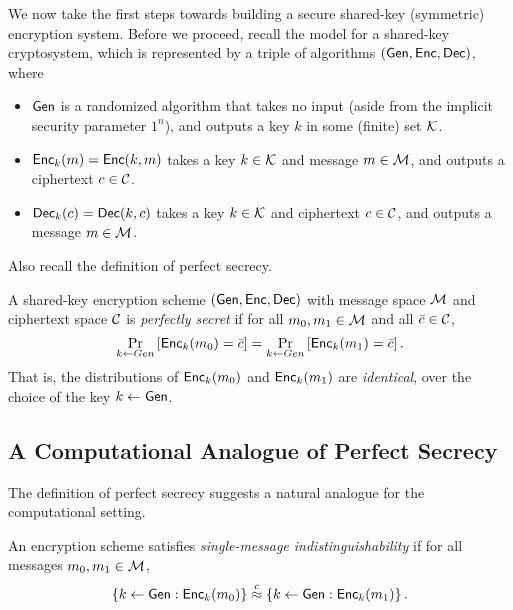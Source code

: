 \documentclass[11pt]{article}
\begin{document}
We now take the first steps towards building a secure shared-key
(symmetric) encryption system.  Before we proceed, recall the model
for a shared-key cryptosystem, which is represented by a triple of
algorithms $(\mathsf{Gen}, \mathsf{Enc},\mathsf{Dec})$, where
\begin{itemize}
\item $\mathsf{Gen}$ is a randomized algorithm that takes no input (aside
  from the implicit security parameter $1^{n}$), and outputs a key $k$
  in some (finite) set $\mathcal{K}$.
\item $\mathsf{Enc}_k(m) = \mathsf{Enc}(k,m)$ takes a key $k \in \mathcal{K}$ and
  message $m \in \mathcal{M}$, and outputs a ciphertext $c \in
  \mathcal{C}$.
\item $\mathsf{Dec}_k(c) = \mathsf{Dec}(k, c)$ takes a key $k \in \mathcal{K}$ and
  ciphertext $c \in \mathcal{C}$, and outputs a message $m \in
  \mathcal{M}$.
\end{itemize}

Also recall the definition of perfect secrecy.

\begin{definition}
  A shared-key encryption scheme $(\mathsf{Gen}, \mathsf{Enc}, \mathsf{Dec})$ with
  message space $\mathcal{M}$ and ciphertext space $\mathcal{C}$ is
  \textit{perfectly secret} if for all $m_0, m_1 \in \mathcal{M}$ and
  all $\bar{c} \in \mathcal{C}$,
  \[ \Pr_{k \gets Gen} \left[ \mathsf{Enc}_k(m_0) = \bar{c} \right] =
  \Pr_{k \gets Gen} \left[ \mathsf{Enc}_k(m_1) = \bar{c} \right]. \] That
  is, the distributions of $\mathsf{Enc}_{k}(m_{0})$ and
  $\mathsf{Enc}_{k}(m_{1})$ are \emph{identical}, over the choice of the
  key $k \gets \mathsf{Gen}$.
\end{definition}

\subsection{A Computational Analogue of Perfect Secrecy}
\label{sec:comp-anal-perf}

The definition of perfect secrecy suggests a natural analogue for the
computational setting.

\begin{definition}
  \label{def:single-msg-indist}
  An encryption scheme satisfies \emph{single-message
    indistinguishability} if for all messages $m_0,m_1 \in \mathcal{M}$,
  \[ \left\{ k \gets \mathsf{Gen} : \mathsf{Enc}_k(m_0) \right\} \stackrel{c}{\approx}
  \left\{ k \gets \mathsf{Gen} : \mathsf{Enc}_k(m_1) \right\}. \]
\end{definition}
\end{document}
